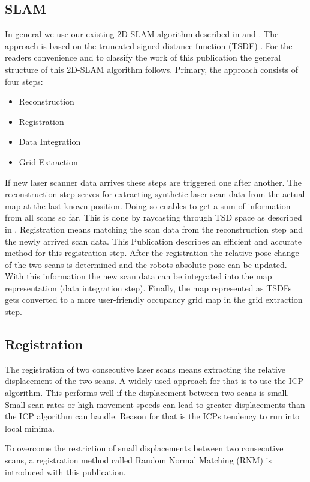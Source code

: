\documentclass[conference]{IEEEtran}
\begin{document}
\subsection{SLAM}
In general we use our existing 2D-SLAM algorithm described in \cite{Koch2015} and \cite{May2014}. The approach is based on the truncated signed distance function (TSDF) . For the readers convenience and to classify the work of this publication the general structure of this 2D-SLAM algorithm follows. Primary, the approach consists of four steps: 
\begin{itemize}
	\item Reconstruction
	\item Registration
	\item Data Integration
	\item Grid Extraction
\end{itemize}
If new laser scanner data  arrives these steps are triggered one after another. The reconstruction step serves for extracting synthetic laser scan data from the actual map at the last known position. Doing so enables to get a sum of information from all scans so far. This is done by raycasting through TSD space as described in \cite{May2014}. Registration means matching the scan data from the reconstruction step and the newly arrived scan data. This Publication describes an efficient and accurate method for this registration step. After the registration the relative pose change of the two scans is determined and the robots absolute pose can be updated. With this information the new scan data can be integrated into the map representation (data integration step). Finally, the map represented as TSDFs gets converted to a more user-friendly occupancy grid map in the grid extraction step. \cite{May2014}

\subsection{Registration}
The registration of two consecutive laser scans means extracting the relative displacement of the two scans. A widely used approach for that is to use the ICP algorithm. This performs well if the displacement between two scans is small. Small scan rates or high movement speeds can lead to greater displacements than the ICP algorithm can handle. Reason for that is the ICPs tendency to run into local minima. 

To overcome the restriction of small displacements between two consecutive scans, a registration method called Random Normal Matching (RNM) is introduced with this publication.
\end{document}
